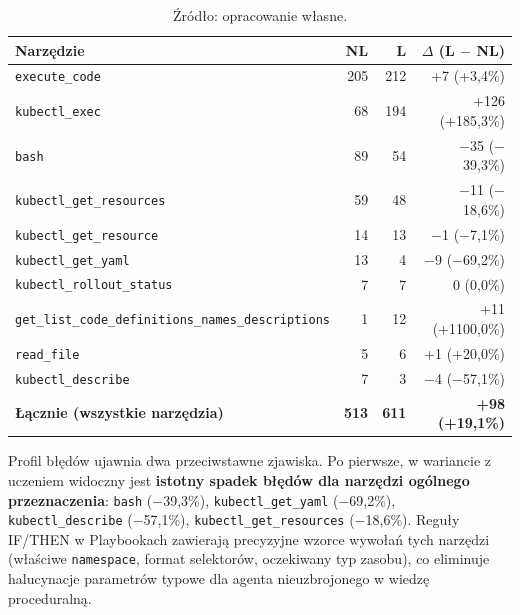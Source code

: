 \begin{table}[H]
    \centering
    \caption{Top-10 narzędzi o największej liczbie błędnych wywołań. Wartość $\Delta$ jest różnicą bezwzględną i względną pomiędzy wariantami.}
    \label{tab:failing-tools}
    \footnotesize
    \begin{tabular}{lrrr}
        \hline
        \textbf{Narzędzie}                                  & \textbf{NL}  & \textbf{L}   & \textbf{$\Delta$ (L $-$ NL)} \\
        \hline
        \texttt{execute\_code}                              & 205          & 212          & +7 (+3,4\%) \\
        \texttt{kubectl\_exec}                              & 68           & 194          & +126 (+185,3\%) \\
        \texttt{bash}                                       & 89           & 54           & $-$35 ($-$39,3\%) \\
        \texttt{kubectl\_get\_resources}                    & 59           & 48           & $-$11 ($-$18,6\%) \\
        \texttt{kubectl\_get\_resource}                     & 14           & 13           & $-$1 ($-$7,1\%) \\
        \texttt{kubectl\_get\_yaml}                         & 13           & 4            & $-$9 ($-$69,2\%) \\
        \texttt{kubectl\_rollout\_status}                   & 7            & 7            & 0 (0,0\%) \\
        \texttt{get\_list\_code\_definitions\_names\_descriptions} & 1     & 12           & +11 (+1100,0\%) \\
        \texttt{read\_file}                                 & 5            & 6            & +1 (+20,0\%) \\
        \texttt{kubectl\_describe}                          & 7            & 3            & $-$4 ($-$57,1\%) \\
        \hline
        \textbf{Łącznie (wszystkie narzędzia)}              & \textbf{513} & \textbf{611} & \textbf{+98 (+19,1\%)} \\
        \hline
    \end{tabular}
    \caption*{\footnotesize Źródło: opracowanie własne.}
\end{table}

Profil błędów ujawnia dwa przeciwstawne zjawiska. Po pierwsze, w wariancie z uczeniem widoczny jest \textbf{istotny spadek błędów dla narzędzi ogólnego przeznaczenia}: \texttt{bash} ($-$39,3\%), \texttt{kubectl\_get\_yaml} ($-$69,2\%), \texttt{kubectl\_describe} ($-$57,1\%), \texttt{kubectl\_get\_resources} ($-$18,6\%). Reguły IF/THEN w Playbookach zawierają precyzyjne wzorce wywołań tych narzędzi (właściwe \texttt{namespace}, format selektorów, oczekiwany typ zasobu), co eliminuje halucynacje parametrów typowe dla agenta nieuzbrojonego w wiedzę proceduralną.

